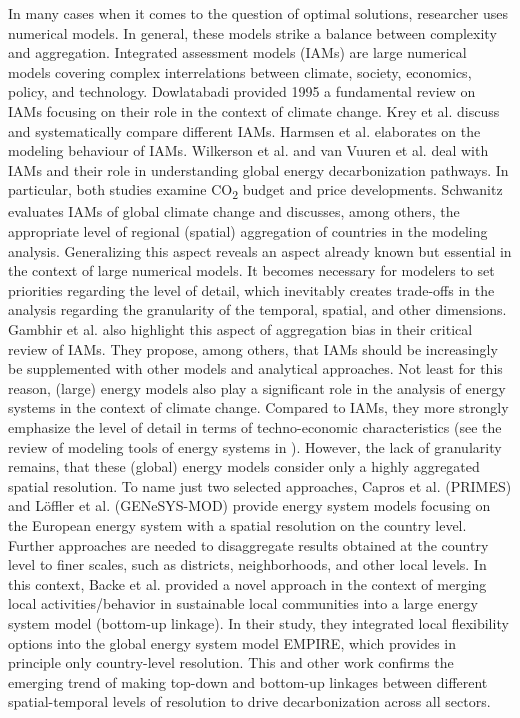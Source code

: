 In many cases when it comes to the question of optimal solutions, researcher uses numerical models. In general, these models strike a balance between complexity and aggregation. Integrated assessment models (IAMs) are large numerical models covering complex interrelations between climate, society, economics, policy, and technology. Dowlatabadi \cite{dowlatabadi1995integrated} provided 1995 a fundamental review on IAMs focusing on their role in the context of climate change. Krey et al. \cite{krey2019looking} discuss and systematically compare different IAMs. Harmsen et al. \cite{harmsen2021integrated} elaborates on the modeling behaviour of IAMs. Wilkerson et al. \cite{wilkerson2015comparison} and van Vuuren et al. \cite{van2016carbon} deal with IAMs and their role in understanding global energy decarbonization pathways. In particular, both studies examine CO\textsubscript{2} budget and price developments. Schwanitz \cite{schwanitz2013evaluating} evaluates IAMs of global climate change and discusses, among others, the appropriate level of regional (spatial) aggregation of countries in the modeling analysis. Generalizing this aspect reveals an aspect already known but essential in the context of large numerical models. It becomes necessary for modelers to set priorities regarding the level of detail, which inevitably creates trade-offs in the analysis regarding the granularity of the temporal, spatial, and other dimensions. Gambhir et al. \cite{gambhir2019review} also highlight this aspect of aggregation bias in their critical review of IAMs. They propose, among others, that IAMs should be increasingly be supplemented with other models and analytical approaches. Not least for this reason, (large) energy models also play a significant role in the analysis of energy systems in the context of climate change. Compared to IAMs, they more strongly emphasize the level of detail in terms of techno-economic characteristics (see the review of modeling tools of energy systems in \cite{ringkjob2018review}). However, the lack of granularity remains, that these (global) energy models consider only a highly aggregated spatial resolution. To name just two selected approaches, Capros et al. \cite{capros2012model} (PRIMES) and Löffler et al. \cite{loffler2017designing} (GENeSYS-MOD) provide energy system models focusing on the European energy system with a spatial resolution on the country level. Further approaches are needed to disaggregate results obtained at the country level to finer scales, such as districts, neighborhoods, and other local levels. In this context, Backe et al. \cite{backe2021heat} provided a novel approach in the context of merging local activities/behavior in sustainable local communities into a large energy system model (bottom-up linkage). In their study, they integrated local flexibility options into the global energy system model EMPIRE, which provides in principle only country-level resolution. This and other work confirms the emerging trend of making top-down and bottom-up linkages between different spatial-temporal levels of resolution to drive decarbonization across all sectors.\vspace{0.3cm}

